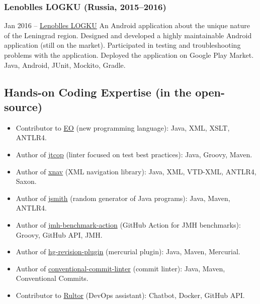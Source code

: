\documentclass{vl}
\begin{document}
    \subsubsection*{Lenoblles LOGKU (Russia, 2015--2016)}
    Jan 2016 – \href{https://play.google.com/store/apps/details?id=com.altinntech.oopt_lo}{Lenoblles LOGKU}
    An Android application about the unique nature of the Leningrad region.
    Designed and developed a highly maintainable Android application (still on the market).
    Participated in testing and troubleshooting problems with the application.
    Deployed the application on Google Play Market.
    Java, Android, JUnit, Mockito, Gradle.

    \subsection*{Hands-on Coding Expertise (in the open-source)}
    \begin{itemize}
        \itemsep0em
        \item Contributor to \href{https://www.eolang.org}{EO} (new programming language):
        Java, XML, XSLT, ANTLR4.
        \item Author of  \href{https://github.com/volodya-lombrozo/jtcop}{jtcop} (linter focused on test best practices):
        Java, Groovy, Maven.
        \item Author of \href{https://github.com/volodya-lombrozo/xnav}{xnav} (XML navigation library): Java, XML,
        VTD-XML, ANTLR4, Saxon.
        \item Author of \href{https://github.com/volodya-lombrozo/jsmith}{jsmith} (random generator of Java programs):
        Java, Maven, ANTLR4.
        \item Author of \href{https://github.com/volodya-lombrozo/jmh-benchmark-action}{jmh-benchmark-action}
        (GitHub Action for JMH benchmarks): Groovy, GitHub API, JMH.
        \item Author of \href{https://github.com/volodya-lombrozo/hg-revision-plugin}{hg-revision-plugin}
        (mercurial plugin): Java, Maven, Mercurial.
        \item Author of
        \href{https://github.com/volodya-lombrozo/conventional-commit-linter}{conventional-commit-linter}
        (commit linter): Java, Maven, Conventional Commits.
        \item Contributor to \href{https://www.rultor.com}{Rultor} (DevOps assistant): Chatbot, Docker, GitHub API.
    \end{itemize}
\end{document}
